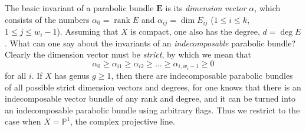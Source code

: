 \documentclass{amsart}
\theoremstyle{plain}
\theoremstyle{definition}
\theoremstyle{remark}
\newcommand{\PP}{\mathbb{P}}
\DeclareMathOperator{\rank}{rank}
\newcommand{\E}{\mathbf{E}}
\begin{document}
The basic invariant of a parabolic bundle $\E$ is its \emph{dimension vector}
$\alpha$, which consists of the numbers $\alpha_0 = \rank E$
and $\alpha_{ij}=\dim E_{ij}$ ($1\le i\le k$, $1\le j\le w_i-1$).
Assuming that $X$ is compact,
one also has the degree, $d=\deg E$.
What can one say about the invariants of an \emph{indecomposable}
parabolic bundle?
Clearly the dimension vector must be \emph{strict}, by which we mean that
%
\begin{equation}
\label{e:strict}
\alpha_0 \ge \alpha_{i1} \ge \alpha_{i2} \ge \dots \ge \alpha_{i,w_i-1} \ge 0
\end{equation}
%
for all $i$.
If $X$ has genus $g \ge 1$, then there are indecomposable parabolic
bundles of all possible strict dimension vectors and degrees, for
one knows that there is an indecomposable vector bundle
of any rank and degree, and it can be turned into an indecomposable
parabolic bundle using arbitrary flags.
Thus we restrict to the case when $X = \PP^1$, the complex projective
line.
\end{document}
